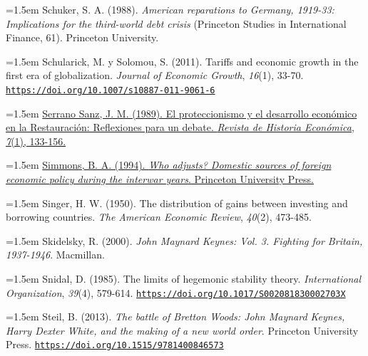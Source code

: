 \documentclass[10pt,a4paper]{article}
\begin{document}
{\sloppy\noindent\hangindent=1.5em Schuker, S. A. (1988). \textit{American reparations to Germany, 1919-33: Implications for the third-world debt crisis} (Princeton Studies in International Finance, 61). Princeton University.\par}

{\sloppy\noindent\hangindent=1.5em Schularick, M. y Solomou, S. (2011). Tariffs and economic growth in the first era of globalization. \textit{Journal of Economic Growth}, \textit{16}(1), 33-70. \href{https://doi.org/10.1007/s10887-011-9061-6}{\nolinkurl{https://doi.org/10.1007/s10887-011-9061-6}}\par}

{\sloppy\noindent\hangindent=1.5em \href{https://e-archivo.uc3m.es/bitstream/handle/10016/1719/RHE-1989-VII-1-Serrano.Sanz.pdf?sequence=1}{Serrano Sanz, J. M. (1989). El proteccionismo y el desarrollo económico en la Restauración: Reflexiones para un debate. \textit{Revista de Historia Económica}, \textit{7}(1), 133-156.}\par}

{\sloppy\noindent\hangindent=1.5em \href{https://press.princeton.edu/isbn/9780691017105}{Simmons, B. A. (1994). \textit{Who adjusts? Domestic sources of foreign economic policy during the interwar years}. Princeton University Press.}\par}

{\sloppy\noindent\hangindent=1.5em Singer, H. W. (1950). The distribution of gains between investing and borrowing countries. \textit{The American Economic Review}, \textit{40}(2), 473-485.\par}

{\sloppy\noindent\hangindent=1.5em Skidelsky, R. (2000). \textit{John Maynard Keynes: Vol. 3. Fighting for Britain, 1937-1946}. Macmillan.\par}

{\sloppy\noindent\hangindent=1.5em Snidal, D. (1985). The limits of hegemonic stability theory. \textit{International Organization}, \textit{39}(4), 579-614. \href{https://doi.org/10.1017/S002081830002703X}{\nolinkurl{https://doi.org/10.1017/S002081830002703X}}\par}

{\sloppy\noindent\hangindent=1.5em Steil, B. (2013). \textit{The battle of Bretton Woods: John Maynard Keynes, Harry Dexter White, and the making of a new world order}. Princeton University Press. \href{https://doi.org/10.1515/9781400846573}{\nolinkurl{https://doi.org/10.1515/9781400846573}}\par}
\end{document}
